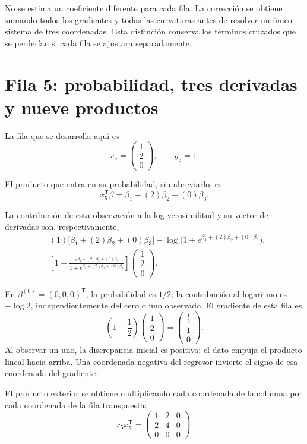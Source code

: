 \documentclass[11pt,a4paper]{article}
\newcommand{\T}{^{\mathsf T}}
\begin{document}
No se estima un coeficiente diferente para cada fila.
La corrección se obtiene sumando todos los gradientes y todas
las curvaturas antes de resolver un único sistema de tres coordenadas.
Esta distinción conserva los términos cruzados que se perderían
si cada fila se ajustara separadamente.

\clearpage
\section{Fila 5: probabilidad, tres derivadas y nueve productos}\label{logit87}
La fila que se desarrolla aquí es
\[
x_{5}=\begin{pmatrix}1\\2\\0\end{pmatrix},\qquad y_{5}=1.
\]

El producto que entra en su probabilidad, sin abreviarlo, es
\[
x_{5}\T\beta=\beta_1+(2)\beta_2+(0)\beta_3.
\]

La contribución de esta observación a la log-verosimilitud
y su vector de derivadas son, respectivamente,
\[
\begin{aligned}
&(1)\bigl[\beta_1+(2)\beta_2+(0)\beta_3\bigr]-\log\bigl(1+e^{\beta_1+(2)\beta_2+(0)\beta_3}\bigr),\\&\left[1-\frac{e^{\beta_1+(2)\beta_2+(0)\beta_3}}{1+e^{\beta_1+(2)\beta_2+(0)\beta_3}}\right]\begin{pmatrix}1\\2\\0\end{pmatrix}.\end{aligned}
\]

En \(\beta^{(0)}=(0,0,0)\T\), la probabilidad es \(1/2\);
la contribución al logaritmo es \(-\log2\), independientemente
del cero o uno observado. El gradiente de esta fila es
\[
\left(1-\frac12\right)\begin{pmatrix}1\\2\\0\end{pmatrix}=\begin{pmatrix}\frac{1}{2}\\1\\0\end{pmatrix}.
\]
Al observar un uno, la discrepancia inicial es positiva: el dato empuja el producto lineal hacia arriba. Una coordenada negativa del regresor invierte el signo de esa coordenada del gradiente.

El producto exterior se obtiene multiplicando cada coordenada
de la columna por cada coordenada de la fila transpuesta:
\[
x_{5}x_{5}\T=\begin{pmatrix}1&2&0\\2&4&0\\0&0&0\end{pmatrix}.
\]
\end{document}
